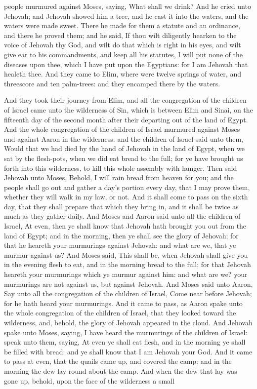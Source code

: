 people murmured against Moses, saying, What shall we drink? And he cried unto Jehovah; and Jehovah showed him a tree, and he cast it into the waters, and the waters were made sweet. There he made for them a statute and an ordinance, and there he proved them; and he said, If thou wilt diligently hearken to the voice of Jehovah thy God, and wilt do that which is right in his eyes, and wilt give ear to his commandments, and keep all his statutes, I will put none of the diseases upon thee, which I have put upon the Egyptians: for I am Jehovah that healeth thee.  And they came to Elim, where were twelve springs of water, and threescore and ten palm-trees: and they encamped there by the waters. 

And they took their journey from Elim, and all the congregation of the children of Israel came unto the wilderness of Sin, which is between Elim and Sinai, on the fifteenth day of the second month after their departing out of the land of Egypt. And the whole congregation of the children of Israel murmured against Moses and against Aaron in the wilderness: and the children of Israel said unto them, Would that we had died by the hand of Jehovah in the land of Egypt, when we sat by the flesh-pots, when we did eat bread to the full; for ye have brought us forth into this wilderness, to kill this whole assembly with hunger.  Then said Jehovah unto Moses, Behold, I will rain bread from heaven for you; and the people shall go out and gather a day’s portion every day, that I may prove them, whether they will walk in my law, or not. And it shall come to pass on the sixth day, that they shall prepare that which they bring in, and it shall be twice as much as they gather daily. And Moses and Aaron said unto all the children of Israel, At even, then ye shall know that Jehovah hath brought you out from the land of Egypt; and in the morning, then ye shall see the glory of Jehovah; for that he heareth your murmurings against Jehovah: and what are we, that ye murmur against us? And Moses said, This shall be, when Jehovah shall give you in the evening flesh to eat, and in the morning bread to the full; for that Jehovah heareth your murmurings which ye murmur against him: and what are we? your murmurings are not against us, but against Jehovah. And Moses said unto Aaron, Say unto all the congregation of the children of Israel, Come near before Jehovah; for he hath heard your murmurings. And it came to pass, as Aaron spake unto the whole congregation of the children of Israel, that they looked toward the wilderness, and, behold, the glory of Jehovah appeared in the cloud. And Jehovah spake unto Moses, saying, I have heard the murmurings of the children of Israel: speak unto them, saying, At even ye shall eat flesh, and in the morning ye shall be filled with bread: and ye shall know that I am Jehovah your God.  And it came to pass at even, that the quails came up, and covered the camp: and in the morning the dew lay round about the camp. And when the dew that lay was gone up, behold, upon the face of the wilderness a small 